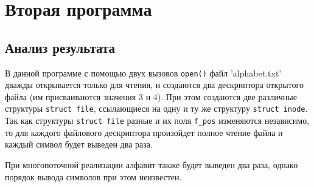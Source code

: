 \chapter{Вторая программа}

\vspace{-0.5cm}


\clearpage
{}


\vspace{-0.7cm}
\section*{Анализ результата}
\vspace{-0.2cm}

В данной программе с помощью двух вызовов \texttt{open()} файл 'alphabet.txt'
дважды открывается только для чтения, и создаются два дескриптора открытого
файла (им присваиваются значения 3 и 4). При этом создаются две различные
структуры \texttt{struct file}, ссылающиеся на одну и ту же структуру
\texttt{struct~inode}. Так как структуры \texttt{struct file} разные и их поля
\texttt{f\_pos} изменяются независимо, то для каждого файлового дескриптора
произойдет полное чтение файла и каждый символ будет выведен два
раза.

При многопоточной реализации алфавит также будет выведен два раза, однако
порядок вывода символов при этом неизвестен.


